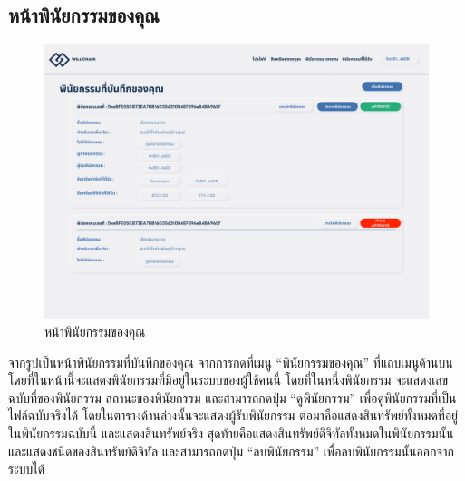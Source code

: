 \documentclass[12pt,oneside,openright,a4paper]{cpe-thai-project}
\begin{document}
\clearpage
\subsection{หน้าพินัยกรรมของคุณ}
		\begin{figure}[!thb]
			\centering
			\includegraphics[scale=0.2]{userWill}
			\caption{หน้าพินัยกรรมของคุณ}
		\end{figure}
		\FloatBarrier
		\tab จากรูปเป็นหน้าพินัยกรรมที่บันทึกของคุณ จากการกดที่เมนู “พินัยกรรมของคุณ” ที่แถบเมนูด้านบน โดยที่ในหน้านี้จะแสดงพินัยกรรมที่มีอยู่ในระบบของผู้ใช้คนนี้ โดยที่ในหนึ่งพินัยกรรม จะแสดงเลขฉบับที่ของพินัยกรรม สถานะของพินัยกรรม และสามารถกดปุ่ม “ดูพินัยกรรม” เพื่อดูพินัยกรรมที่เป็นไฟล์ฉบับจริงได้ โดยในตารางด้านล่างนั้นจะแสดงผู้รับพินัยกรรม ต่อมาคือแสดงสินทรัพย์ทั้งหมดที่อยู่ในพินัยกรรมฉบับนี้ และแสดงสินทรัพย์จริง สุดท้ายคือแสดงสินทรัพย์ดิจิทัลทั้งหมดในพินัยกรรมนั้น และแสดงชนิดของสินทรัพย์ดิจิทัล  และสามารถกดปุ่ม “ลบพินัยกรรม” เพื่อลบพินัยกรรมนั้นออกจากระบบได้
\end{document}
